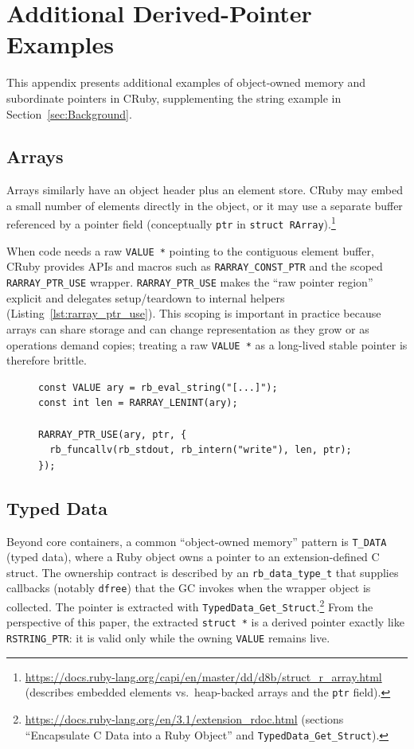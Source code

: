 \appendix
\section{Additional Derived-Pointer Examples}\label{app:derived_pointers}

This appendix presents additional examples of object-owned memory and subordinate pointers in CRuby, supplementing the string example in Section~\ref{sec:Background}.

\subsection*{Arrays}
Arrays similarly have an object header plus an element store.  CRuby may embed a small
number of elements directly in the object, or it may use a separate buffer referenced
by a pointer field (conceptually \texttt{ptr} in \texttt{struct RArray}).\footnote{\url{https://docs.ruby-lang.org/capi/en/master/dd/d8b/struct_r_array.html}
(describes embedded elements vs.\ heap-backed arrays and the \texttt{ptr} field).}

When code needs a raw \texttt{VALUE *} pointing to the contiguous element buffer,
CRuby provides APIs and macros such as \texttt{RARRAY\_CONST\_PTR} and the scoped
\texttt{RARRAY\_PTR\_USE} wrapper.  \texttt{RARRAY\_PTR\_USE} makes the ``raw pointer
region'' explicit and delegates setup/teardown to internal helpers (Listing~\ref{lst:rarray_ptr_use}).
This scoping is important in practice because arrays can share storage and can change
representation as they grow or as operations demand copies; treating a raw
\texttt{VALUE *} as a long-lived stable pointer is therefore brittle.

\begin{figure}[tb]
\begin{lstlisting}[caption={Scoped raw-pointer access for arrays via \texttt{RARRAY\_PTR\_USE} (from \texttt{rarray.h} documentation).},label={lst:rarray_ptr_use}]
const VALUE ary = rb_eval_string("[...]");
const int len = RARRAY_LENINT(ary);

RARRAY_PTR_USE(ary, ptr, {
  rb_funcallv(rb_stdout, rb_intern("write"), len, ptr);
});
\end{lstlisting}
\end{figure}

\subsection*{Typed Data}
Beyond core containers, a common ``object-owned memory'' pattern is \texttt{T\_DATA}
(typed data), where a Ruby object owns a pointer to an extension-defined C struct.
The ownership contract is described by an \texttt{rb\_data\_type\_t} that supplies
callbacks (notably \texttt{dfree}) that the GC invokes when the wrapper object is
collected.  The pointer is extracted with \texttt{TypedData\_Get\_Struct}.\footnote{\url{https://docs.ruby-lang.org/en/3.1/extension_rdoc.html} (sections
``Encapsulate C Data into a Ruby Object'' and \texttt{TypedData\_Get\_Struct}).}
From the perspective of this paper, the extracted \texttt{struct *} is a derived
pointer exactly like \texttt{RSTRING\_PTR}: it is valid only while the owning
\texttt{VALUE} remains live.


